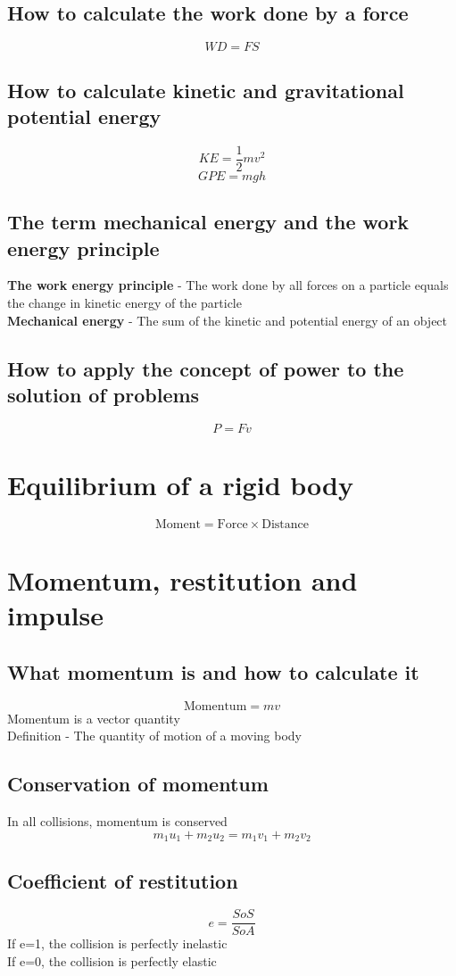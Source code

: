 \documentclass{article}[18pt]
\begin{document}
\subsection{How to calculate the work done by a force}
$$WD=FS$$
\subsection{How to calculate kinetic and gravitational potential energy}
$$KE=\frac{1}{2}mv^2$$
$$GPE=mgh$$
\subsection{The term mechanical energy and the work energy principle}
\textbf{The work energy principle} - The work done by all forces on a particle equals the change in kinetic energy of the particle\\
\textbf{Mechanical energy} - The sum of the kinetic and potential energy of an object
\subsection{How to apply the concept of power to the solution of problems}
$$P=Fv$$
\newpage
\section{Equilibrium of a rigid body}
$$\textrm{Moment}=\textrm{Force}\times\textrm{Distance}$$
\section{Momentum, restitution and impulse}
\subsection{What momentum is and how to calculate it}
$$\textrm{Momentum}=mv$$
Momentum is a vector quantity\\
Definition - The quantity of motion of a moving body
\subsection{Conservation of momentum}
In all collisions, momentum is conserved
$$m_1u_1+m_2u_2=m_1v_1+m_2v_2$$
\subsection{Coefficient of restitution}
$$e=\frac{SoS}{SoA}$$
If e=1, the collision is perfectly inelastic\\
If e=0, the collision is perfectly elastic
\end{document}
